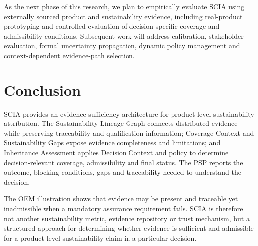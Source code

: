 \documentclass[english]{lni}
\begin{document}
As the next phase of this research, we plan to empirically evaluate SCIA using externally sourced product and sustainability evidence, including real-product prototyping and controlled evaluation of decision-specific coverage and admissibility conditions. Subsequent work will address calibration, stakeholder evaluation, formal uncertainty propagation, dynamic policy management and context-dependent evidence-path selection.

\section{Conclusion}
SCIA provides an evidence-sufficiency architecture for product-level sustainability attribution. The Sustainability Lineage Graph connects distributed evidence while preserving traceability and qualification information; Coverage Context and Sustainability Gaps expose evidence completeness and limitations; and Inheritance Assessment applies Decision Context and policy to determine decision-relevant coverage, admissibility and final status. The PSP reports the outcome, blocking conditions, gaps and traceability needed to understand the decision.

The OEM illustration shows that evidence may be present and traceable yet inadmissible when a mandatory assurance requirement fails. SCIA is therefore not another sustainability metric, evidence repository or trust mechanism, but a structured approach for determining whether evidence is sufficient and admissible for a product-level sustainability claim in a particular decision.

\printbibliography
\end{document}
